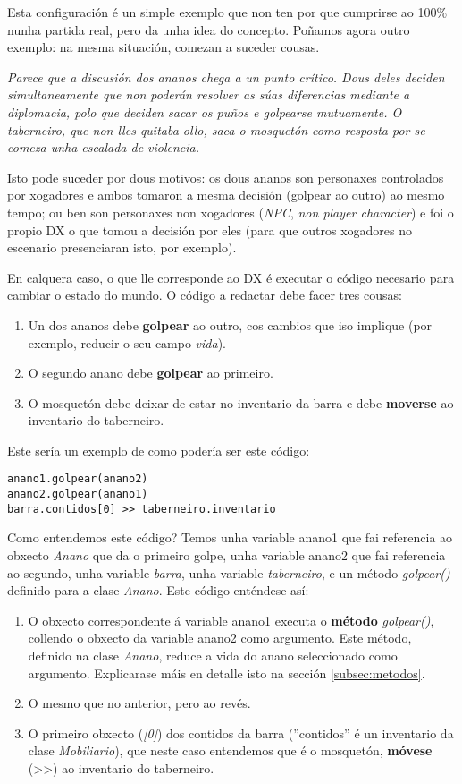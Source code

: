 \par
Esta configuración é un simple exemplo que non ten por que cumprirse ao
100\% nunha partida real, pero da unha idea do concepto. Poñamos agora outro
exemplo: na mesma situación, comezan a suceder cousas.
\par
{\it Parece que a discusión dos ananos chega a un punto crítico. Dous deles
deciden simultaneamente que non poderán resolver as súas diferencias mediante a
diplomacia, polo que deciden sacar os puños e golpearse mutuamente. O
taberneiro, que non lles quitaba ollo, saca o mosquetón como resposta por se
comeza unha escalada de violencia.}
\par
Isto pode suceder por dous motivos: os dous ananos son personaxes
controlados por xogadores e ambos tomaron a mesma decisión (golpear ao outro) ao
mesmo tempo; ou ben son personaxes non xogadores ({\it NPC}, {\it non player
character}) e foi o propio DX o que tomou a decisión por eles (para que outros
xogadores no escenario presenciaran isto, por exemplo).
\par
En calquera caso, o que lle corresponde ao DX é executar o código necesario para
cambiar o estado do mundo. O código a redactar debe facer tres cousas:
\begin{enumerate}
  \item Un dos ananos debe {\bf golpear} ao outro, cos cambios que iso implique
  (por exemplo, reducir o seu campo {\it vida}).
  \item O segundo anano debe {\bf golpear} ao primeiro.
  \item O mosquetón debe deixar de estar no inventario da barra e debe
  {\bf moverse} ao inventario do taberneiro.
\end{enumerate}
\par
Este sería un exemplo de como podería ser este código:
\begin{lstlisting}
anano1.golpear(anano2)
anano2.golpear(anano1)
barra.contidos[0] >> taberneiro.inventario
\end{lstlisting}
\par
Como entendemos este código? Temos unha variable anano1 que fai referencia ao
obxecto {\it Anano} que da o primeiro golpe, unha variable anano2 que fai
referencia ao segundo, unha variable {\it barra}, unha variable {\it
taberneiro}, e un método {\it golpear()} definido para a clase {\it Anano}. Este
código enténdese así:
\begin{enumerate}
  \item O obxecto correspondente á variable anano1 executa o {\bf método}
  {\it golpear()}, collendo o obxecto da variable anano2 como argumento. Este
  método, definido na clase {\it Anano}, reduce a vida do anano seleccionado
  como argumento. Explicarase máis en detalle isto na sección
  \ref{subsec:metodos}.
  \item O mesmo que no anterior, pero ao revés.
  \item O primeiro obxecto ({\it [0]}) dos contidos da barra (''contidos'' é un
  inventario da clase {\it Mobiliario}), que neste caso entendemos que é o
  mosquetón, {\bf móvese} (>>) ao inventario do taberneiro. 
\end{enumerate}

